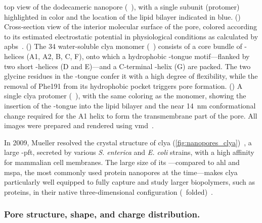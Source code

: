 \begin{figure*}[p]
{  %
  top view of the dodecameric  nanopore (~\cite{Peng-2019}), with a single
  subunit (protomer) highlighted in color and the location of the lipid bilayer indicated in blue.
  ()
  Cross-section view of the interior molecular surface of the pore, colored according to its estimated
  electrostatic potential in physiological conditions as calculated by
  \gls{apbs}~\cite{Baker-2001,Baker-2005}.
  ()
  The \SI{34}{\kDa} water-soluble \gls{clya} monomer (~\cite{Wallace-2000}) consists of a core
  bundle of \ta-helices (\ta A1, \ta A2, \ta B, \ta C, \ta F), onto which a hydrophobic \tb-tongue
  motif---flanked by two short \ta-helices (\ta D and \ta E)---and a C-terminal \ta-helix (\ta G) are packed.
  The two glycine residues in the \tb-tongue confer it with a high degree of flexibility, while the removal of
  Phe191 from its hydrophobic pocket triggers pore formation.
  ()
  A single \gls{clya} protomer (~\cite{Peng-2019}), with the same coloring as the monomer, showing
  the insertion of the \ta-tongue into the lipid bilayer and the near \SI{14}{\nm} conformational change
  required for the \ta A1 helix to form the transmembrane part of the pore.
  All images were prepared and rendered using \gls{vmd}~\cite{Humphrey-1996,Stone-1998}.
  }\label{fig:nanopores_clya}
\end{figure*}

In 2009, Mueller \etal{} resolved the crystal structure of \gls{clya}
(\cref{fig:nanopores_clya})~\cite{Mueller-2009}, a large \ta-\gls{pft}, secreted by various \textit{S.
enterica} and \textit{E. coli} strains, with a high affinity for mammalian cell membranes. The large size of
its \lumen{}---compared to \gls{ahl} and \gls{mspa}, the most commonly used protein nanopores at the
time---makes \gls{clya} particularly well equipped to fully capture and study larger biopolymers, such as
proteins, in their native three-dimensional configuration
(\ie~folded)~\cite{Soskine-2013,Soskine-Biesemans-2015}.


\subsubsection{Pore structure, shape, and charge distribution.}
%

